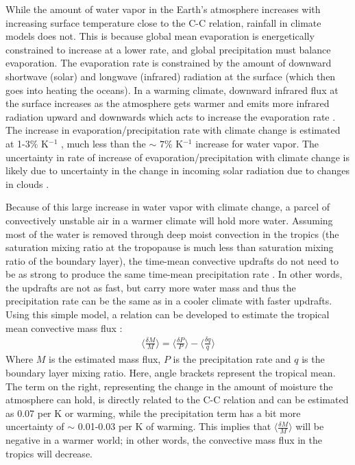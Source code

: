 \documentclass[letterpaper,12pt,titlepage,oneside,final]{book}
\begin{document}
While the amount of water vapor in the Earth's atmosphere increases with increasing surface temperature close to the C-C relation, rainfall in climate models does not. This is because global mean evaporation is energetically constrained to increase at a lower rate, and global precipitation must balance evaporation. The evaporation rate is constrained by the amount of downward shortwave (solar) and longwave (infrared) radiation at the surface (which then goes into heating the oceans). In a warming climate, downward infrared flux at the surface increases as the atmosphere gets warmer and emits more infrared radiation upward and downwards which acts to increase the evaporation rate \cite{boer_climate_1993}. The increase in evaporation/precipitation rate with climate change is estimated at 1-3$\%$ K$^{-1}$ \cite{schneider_water_2010,he_anthropogenic_2015,boer_climate_1993}, much less than the $\sim$ $7 \%$ K$^{-1}$ increase for water vapor. The uncertainty in rate of increase of evaporation/precipitation with climate change is likely due to uncertainty in the change in incoming solar radiation due to changes in clouds \cite{allen_constraints_2002}.

Because of this large increase in water vapor with climate change, a parcel of convectively unstable air in a warmer climate will hold more water. Assuming most of the water is removed through deep moist convection in the tropics (the saturation mixing ratio at the tropopause is much less than saturation mixing ratio of the boundary layer), the time-mean convective updrafts do not need to be as strong to produce the same time-mean precipitation rate \cite{held_robust_2006,vecchi_global_2007}. In other words, the updrafts are not as fast, but carry more water mass and thus the precipitation rate can be the same as in a cooler climate with faster updrafts. Using this simple model, a relation can be developed to estimate the tropical mean convective mass flux \cite{held_robust_2006}:
\begin{align}
\Bigg\langle\frac{\delta{M}}{M}\Bigg\rangle=\Bigg\langle\frac{\delta{P}}{P}\Bigg\rangle-\Bigg\langle\frac{\delta{q}}{q}\Bigg\rangle
\end{align}
Where $M$ is the estimated mass flux, $P$ is the precipitation rate and $q$ is the boundary layer mixing ratio. Here, angle brackets represent the tropical mean. The term on the right, representing the change in the amount of moisture the atmosphere can hold, is directly related to the C-C relation and can be estimated as 0.07 per K or warming, while the precipitation term has a bit more uncertainty of $\sim$ 0.01-0.03 per K of warming. This implies that $\langle\frac{\delta{M}}{M}\rangle$ will be negative in a warmer world; in other words, the convective mass flux in the tropics will decrease. 
\end{document}
